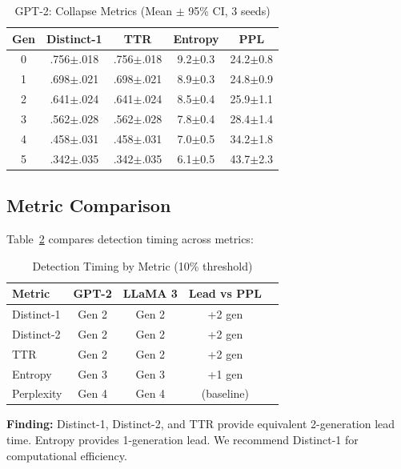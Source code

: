 \documentclass[conference]{IEEEtran}
\begin{document}
\begin{table}[!t]
\caption{GPT-2: Collapse Metrics (Mean $\pm$ 95\% CI, 3 seeds)}
\label{tab:main_results}
\centering
\small
\begin{tabular}{@{}ccccc@{}}
\toprule
\textbf{Gen} & \textbf{Distinct-1} & \textbf{TTR} & \textbf{Entropy} & \textbf{PPL} \\
\midrule
0 & .756$\pm$.018 & .756$\pm$.018 & 9.2$\pm$0.3 & 24.2$\pm$0.8 \\
1 & .698$\pm$.021 & .698$\pm$.021 & 8.9$\pm$0.3 & 24.8$\pm$0.9 \\
2 & .641$\pm$.024 & .641$\pm$.024 & 8.5$\pm$0.4 & 25.9$\pm$1.1 \\
3 & .562$\pm$.028 & .562$\pm$.028 & 7.8$\pm$0.4 & 28.4$\pm$1.4 \\
4 & .458$\pm$.031 & .458$\pm$.031 & 7.0$\pm$0.5 & 34.2$\pm$1.8 \\
5 & .342$\pm$.035 & .342$\pm$.035 & 6.1$\pm$0.5 & 43.7$\pm$2.3 \\
\bottomrule
\end{tabular}
\end{table}

\subsection{Metric Comparison}
\label{sec:metrics_comparison}

Table~\ref{tab:metric_comparison} compares detection timing across metrics:

\begin{table}[!t]
\caption{Detection Timing by Metric (10\% threshold)}
\label{tab:metric_comparison}
\centering
\small
\begin{tabular}{@{}lcccc@{}}
\toprule
\textbf{Metric} & \textbf{GPT-2} & \textbf{LLaMA 3} & \textbf{Lead vs PPL} \\
\midrule
Distinct-1 & Gen 2 & Gen 2 & +2 gen \\
Distinct-2 & Gen 2 & Gen 2 & +2 gen \\
TTR & Gen 2 & Gen 2 & +2 gen \\
Entropy & Gen 3 & Gen 3 & +1 gen \\
Perplexity & Gen 4 & Gen 4 & (baseline) \\
\bottomrule
\end{tabular}
\end{table}

\textbf{Finding:} Distinct-1, Distinct-2, and TTR provide equivalent 2-generation lead time. Entropy provides 1-generation lead. We recommend Distinct-1 for computational efficiency.
\end{document}
